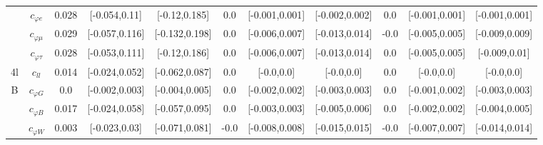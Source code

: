 \documentclass{article}
\begin{document}
\begin{table}[H]
\begin{tabular}{|c|c|c|c|c|c|c|c|c|c|c|}
 & $c_{\varphi e}$ & 0.028                             & [-0.054,0.11]                                 & [-0.12,0.185] & 0.0                             & [-0.001,0.001]                                 & [-0.002,0.002] & 0.0                             & [-0.001,0.001]                                 & [-0.001,0.001] \\ \cline{2-11}
 & $c_{\varphi \mu}$ & 0.029                             & [-0.057,0.116]                                 & [-0.132,0.198] & 0.0                             & [-0.006,0.007]                                 & [-0.013,0.014] & -0.0                             & [-0.005,0.005]                                 & [-0.009,0.009] \\ \cline{2-11}
 & $c_{\varphi \tau}$ & 0.028                             & [-0.053,0.111]                                 & [-0.12,0.186] & 0.0                             & [-0.006,0.007]                                 & [-0.013,0.014] & 0.0                             & [-0.005,0.005]                                 & [-0.009,0.01] \\ \cline{2-11}
\hline
\multirow{1}{*}{4l}
 & $c_{ll}$ & 0.014                             & [-0.024,0.052]                                 & [-0.062,0.087] & 0.0                             & [-0.0,0.0]                                 & [-0.0,0.0] & 0.0                             & [-0.0,0.0]                                 & [-0.0,0.0] \\ \cline{2-11}
\hline
\multirow{7}{*}{B}
 & $c_{\varphi G}$ & 0.0                             & [-0.002,0.003]                                 & [-0.004,0.005] & 0.0                             & [-0.002,0.002]                                 & [-0.003,0.003] & 0.0                             & [-0.001,0.002]                                 & [-0.003,0.003] \\ \cline{2-11}
 & $c_{\varphi B}$ & 0.017                             & [-0.024,0.058]                                 & [-0.057,0.095] & 0.0                             & [-0.003,0.003]                                 & [-0.005,0.006] & 0.0                             & [-0.002,0.002]                                 & [-0.004,0.005] \\ \cline{2-11}
 & $c_{\varphi W}$ & 0.003                             & [-0.023,0.03]                                 & [-0.071,0.081] & -0.0                             & [-0.008,0.008]                                 & [-0.015,0.015] & -0.0                             & [-0.007,0.007]                                 & [-0.014,0.014] \\ \cline{2-11}

\end{tabular}
\end{table}
\end{document}
